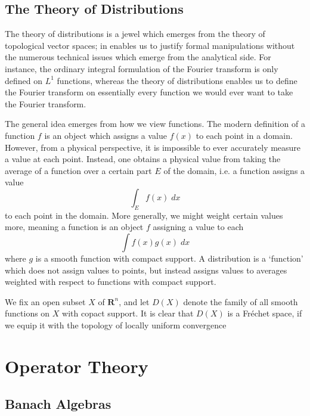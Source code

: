 







\chapter{The Theory of Distributions}

The theory of distributions is a jewel which emerges from the theory of topological vector spaces; in enables us to justify formal manipulations without the numerous technical issues which emerge from the analytical side. For instance, the ordinary integral formulation of the Fourier transform is only defined on $L^1$ functions, whereas the theory of distributions enables us to define the Fourier transform on essentially every function we would ever want to take the Fourier transform.

The general idea emerges from how we view functions. The modern definition of a function $f$ is an object which assigns a value $f(x)$ to each point in a domain. However, from a physical perspective, it is impossible to ever accurately measure a value at each point. Instead, one obtains a physical value from taking the average of a function over a certain part $E$ of the domain, i.e. a function assigns a value
%
\[ \int_E f(x)\; dx \]
%
to each point in the domain. More generally, we might weight certain values more, meaning a function is an object $f$ assigning a value to each
%
\[ \int f(x) g(x)\; dx \]
%
where $g$ is a smooth function with compact support. A distribution is a `function' which does not assign values to points, but instead assigns values to averages weighted with respect to functions with compact support.

We fix an open subset $X$ of $\mathbf{R}^n$, and let $D(X)$ denote the family of all smooth functions on $X$ with copact support. It is clear that $D(X)$ is a Fr\'{e}chet space, if we equip it with the topology of locally uniform convergence 










\part{Operator Theory}





\chapter{Banach Algebras}

